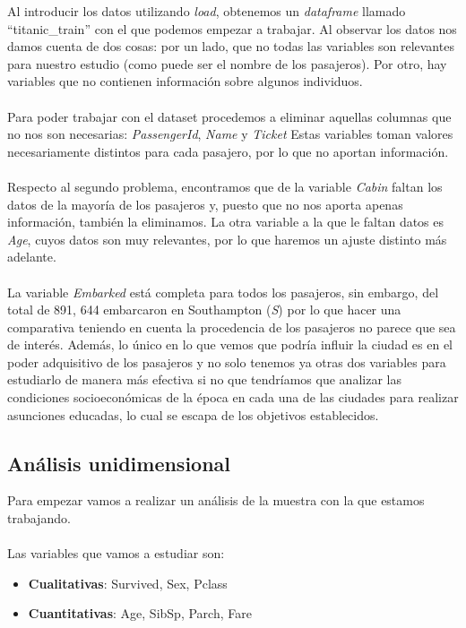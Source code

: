 \documentclass{article}
\begin{document}
Al introducir los datos utilizando \textit{load}, obtenemos un \textit{dataframe} llamado ``titanic\_train'' con el que podemos empezar a trabajar. Al observar los datos nos damos cuenta de dos cosas: por un lado, que no todas las variables son relevantes para nuestro estudio (como puede ser el nombre de los pasajeros). Por otro, hay variables que no contienen información sobre algunos individuos.\\\\
Para poder trabajar con el dataset procedemos a eliminar aquellas columnas que no nos son necesarias: \textit{PassengerId}, \textit{Name} y \textit{Ticket} Estas variables toman valores necesariamente distintos para cada pasajero, por lo que no aportan información.\\\\
Respecto al segundo problema, encontramos que de la variable \textit{Cabin} faltan los datos de la mayoría de los pasajeros y, puesto que no nos aporta apenas información, también la eliminamos. La otra variable a la que le faltan datos es \textit{Age}, cuyos datos son muy relevantes, por lo que haremos un ajuste distinto más adelante.\\\\
La variable \textit{Embarked} está completa para todos los pasajeros, sin embargo, del total de 891, 644 embarcaron en Southampton (\textit{S}) por lo que hacer una comparativa teniendo en cuenta la procedencia de los pasajeros no parece que sea de interés. Además, lo único en lo que vemos que podría influir la ciudad es en el poder adquisitivo de los pasajeros y no solo tenemos ya otras dos variables para estudiarlo de manera más efectiva si no que tendríamos que analizar las condiciones socioeconómicas de la época en cada una de las ciudades para realizar asunciones educadas, lo cual se escapa de los objetivos establecidos. 

\subsection{Análisis unidimensional}

Para empezar vamos a realizar un análisis de la muestra con la que estamos trabajando.\\\\
Las variables que vamos a estudiar son:
\begin{itemize}
    \item \textbf{Cualitativas}: Survived, Sex, Pclass
    \item \textbf{Cuantitativas}: Age, SibSp, Parch, Fare
\end{itemize}
\end{document}
